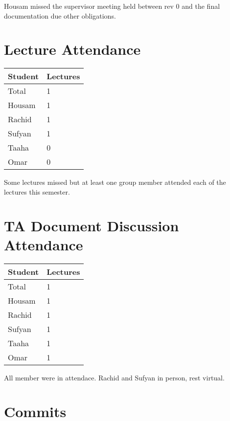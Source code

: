 \documentclass{article}
\begin{document}
Housam missed the supervisor meeting held between rev 0 and the final documentation due other obligations.

\section{Lecture Attendance}


\begin{table}[H]
\centering
\begin{tabular}{ll}
\toprule
\textbf{Student} & \textbf{Lectures}\\
\midrule
Total & 1\\
Housam & 1 \\
Rachid & 1 \\
Sufyan & 1 \\
Taaha & 0 \\
Omar & 0 \\
\bottomrule
\end{tabular}
\end{table}

Some lectures missed but at least one group member attended each of the lectures this semester.

\section{TA Document Discussion Attendance}


\begin{table}[H]
\centering
\begin{tabular}{ll}
\toprule
\textbf{Student} & \textbf{Lectures}\\
\midrule
Total & 1\\
Housam & 1 \\
Rachid & 1 \\
Sufyan & 1 \\
Taaha & 1 \\
Omar & 1 \\
\bottomrule
\end{tabular}
\end{table}

All member were in attendace. Rachid and Sufyan in person, rest virtual.

\section{Commits}
\end{document}
